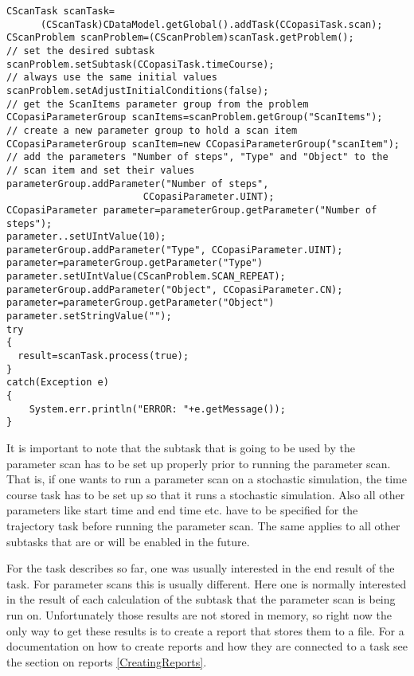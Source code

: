 \documentclass[a4,10pt]{article}
\begin{document}
\begin{lstlisting}
CScanTask scanTask=
      (CScanTask)CDataModel.getGlobal().addTask(CCopasiTask.scan);
CScanProblem scanProblem=(CScanProblem)scanTask.getProblem();
// set the desired subtask
scanProblem.setSubtask(CCopasiTask.timeCourse);
// always use the same initial values
scanProblem.setAdjustInitialConditions(false);
// get the ScanItems parameter group from the problem
CCopasiParameterGroup scanItems=scanProblem.getGroup("ScanItems");
// create a new parameter group to hold a scan item
CCopasiParameterGroup scanItem=new CCopasiParameterGroup("scanItem");
// add the parameters "Number of steps", "Type" and "Object" to the 
// scan item and set their values
parameterGroup.addParameter("Number of steps",
                        CCopasiParameter.UINT);
CCopasiParameter parameter=parameterGroup.getParameter("Number of steps");
parameter..setUIntValue(10);
parameterGroup.addParameter("Type", CCopasiParameter.UINT);
parameter=parameterGroup.getParameter("Type")
parameter.setUIntValue(CScanProblem.SCAN_REPEAT);
parameterGroup.addParameter("Object", CCopasiParameter.CN);
parameter=parameterGroup.getParameter("Object")
parameter.setStringValue("");
try
{
  result=scanTask.process(true);
}
catch(Exception e)
{
    System.err.println("ERROR: "+e.getMessage());
}

\end{lstlisting}

It is important to note that the subtask that is going to be used by the parameter scan has to be set up properly prior to running the parameter scan. That is, if one wants to run a parameter scan on a stochastic simulation, the time course task has to be set up so that it runs a stochastic simulation. Also all other parameters like start time and end time etc. have to be specified for the trajectory task before running the parameter scan.
The same applies to all other subtasks that are or will be enabled in the future.


For the task describes so far, one was usually interested in the end result of the task. For parameter scans this is usually different. Here one is normally interested in the result of each calculation of the subtask that the parameter scan is being run on.
Unfortunately those results are not stored in memory, so right now the only way to get these results is to create a report that stores them to a file. For a documentation on how to create reports and how they are connected to a task see the section on reports \ref{CreatingReports}.
\end{document}
